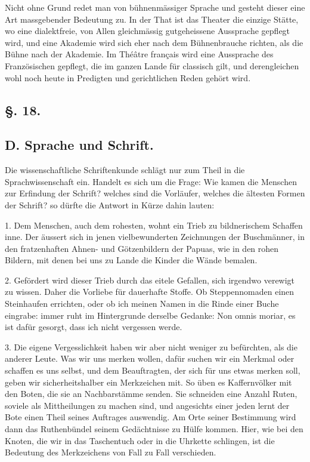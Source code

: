 Nicht ohne Grund redet man von bühnenmässiger Sprache und gesteht dieser eine Art massgebender Bedeutung zu. In der That ist das Theater die einzige Stätte, wo eine dialektfreie, von Allen gleichmässig gutgeheissene Aussprache gepflegt wird, und eine Akademie wird sich eher nach dem Bühnenbrauche richten, als die Bühne nach der Akademie. Im Théâtre français wird eine Aussprache des Französischen gepflegt, die im ganzen Lande für classisch gilt, und derengleichen wohl noch heute in Predigten und gerichtlichen Reden gehört wird.

\subsection*{§. 18.}\label{II.VI.18}
\subsection*{D. Sprache und Schrift.}

Die wissenschaftliche Schriftenkunde schlägt nur zum Theil in die Sprachwissenschaft ein. Handelt es sich um die Frage: Wie kamen die Menschen zur Erfindung der Schrift? welches sind die Vorläufer, welches die ältesten Formen der Schrift? so dürfte die Antwort in Kürze dahin lauten:

1. Dem Menschen, auch dem rohesten, wohnt ein Trieb zu bildnerischem Schaffen inne. Der äussert sich in jenen vielbewunderten Zeichnungen der Buschmänner, in den fratzenhaften Ahnen- und Götzenbildern der Papuas, wie in den rohen Bildern, mit denen bei uns zu Lande die Kinder die Wände bemalen.

2. Gefördert wird dieser Trieb durch das eitele Gefallen, sich irgendwo verewigt zu wissen. Daher die Vorliebe für dauerhafte Stoffe. Ob Steppennomaden einen Steinhaufen errichten, oder ob ich meinen Namen in die Rinde einer Buche eingrabe: immer ruht im Hintergrunde derselbe Gedanke: Non omnis moriar, es ist dafür gesorgt, dass ich nicht vergessen werde.

3. Die eigene Vergesslichkeit haben wir aber nicht weniger zu befürchten, als die anderer Leute. Was wir uns merken wollen, dafür \label{fp.136} suchen wir ein Merkmal oder schaffen es uns selbst, und dem Beauftragten, der sich für uns etwas merken soll, geben wir sicherheitshalber ein Merkzeichen mit. So üben es Kaffernvölker mit den Boten, die sie an Nachbarstämme senden. Sie schneiden eine Anzahl Ruten, soviele als Mittheilungen zu machen sind, und angesichts einer jeden lernt der Bote einen Theil seines Auftrages auswendig. Am Orte \label{sp.128} seiner Bestimmung wird dann das Ruthenbündel seinem Gedächtnisse zu Hülfe kommen. Hier, wie bei den Knoten, die wir in das Taschentuch oder in die Uhrkette schlingen, ist die Bedeutung des Merkzeichens von Fall zu Fall verschieden.

